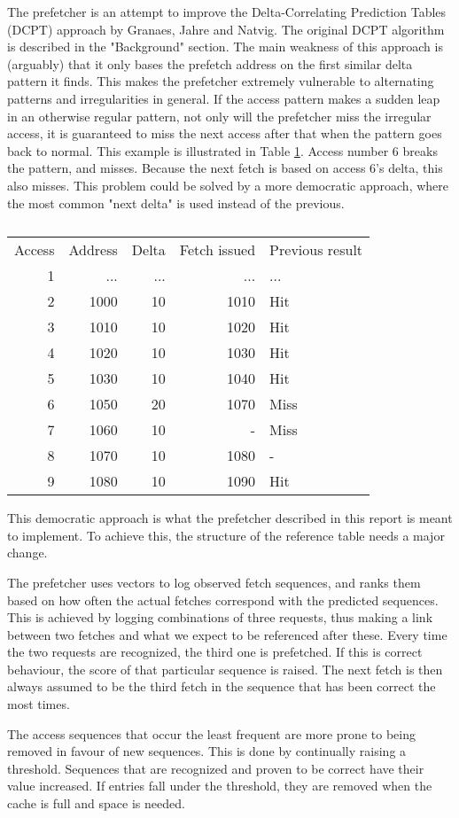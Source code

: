 

The prefetcher is an attempt to improve the Delta-Correlating Prediction Tables (DCPT) approach by Granaes, Jahre and Natvig. The original DCPT algorithm is described in the "Background" section. The main weakness of this approach is (arguably) that it only bases the prefetch address on the first similar delta pattern it finds. This makes the prefetcher extremely vulnerable to alternating patterns and irregularities in general. If the access pattern makes a sudden leap in an otherwise regular pattern, not only will the prefetcher miss the irregular access, it is guaranteed to miss the next access after that when the pattern goes back to normal. This example is illustrated in Table \ref{table:breakDCPT}. Access number 6 breaks the pattern, and misses. Because the next fetch is based on access 6's delta, this also misses. This problem could be solved by a more democratic approach, where the most common "next delta" is used instead of the previous.
\begin{table}[!t]
\renewcommand{\arraystretch}{1.3}
\caption{}
\label{table:breakDCPT}
\centering
\begin{tabular}{rrrrl}
\hline

Access & Address & Delta & Fetch issued & Previous result\\
1 & ... & ... & ... & ...\\
2 & 1000 & 10 & 1010 & Hit\\
3 & 1010 & 10 & 1020 & Hit\\
4 & 1020 & 10 & 1030 & Hit\\
5 & 1030 & 10 & 1040 & Hit\\
6 & 1050 & 20 & 1070 & Miss\\
7 & 1060 & 10 & - 	 & Miss\\
8 & 1070 & 10 & 1080 & -\\
9 & 1080 & 10 & 1090 & Hit
\end{tabular}
\end{table}

This democratic approach is what the prefetcher described in this report is meant to implement. To achieve this, the structure of the reference table needs a major change. 

The prefetcher uses vectors to log observed fetch sequences, and ranks them based on how often the actual fetches correspond with the predicted sequences. This is achieved by logging combinations of three requests, thus making a link between two fetches and what we expect to be referenced after these. Every time the two requests are recognized, the third one is prefetched. If this is correct behaviour, the score of that particular sequence is raised. The next fetch is then always assumed to be the third fetch in the sequence that has been correct the most times.

The access sequences that occur the least frequent are more prone to being removed in favour of new sequences. This is done by continually raising a threshold. Sequences that are recognized and proven to be correct have their value increased. If entries fall under the threshold, they are removed when the cache is full and space is needed.


